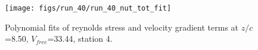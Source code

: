 \begin{figure}[H]
\centering
\texttt{[image: figs/run\_40/run\_40\_nut\_tot\_fit]}
\caption{Polynomial fits of reynolds stress and velocity gradient terms at $z/c$=8.50, $V_{free}$=33.44, station 4.}
\label{fig:run_40_nut_tot_fit}
\end{figure}


